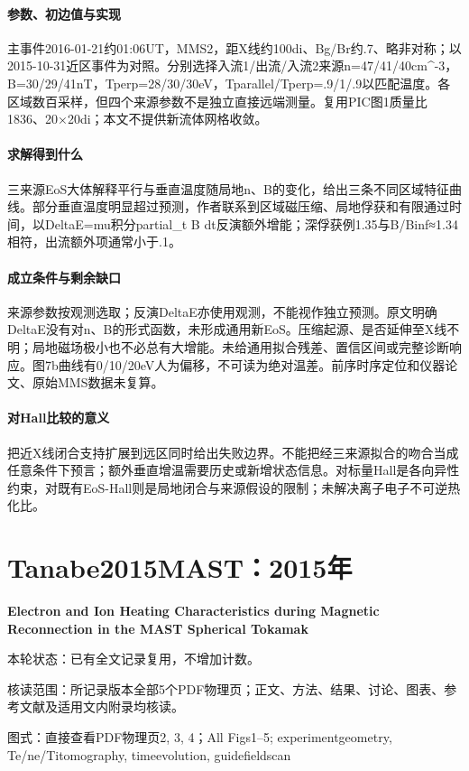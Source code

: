 \paragraph{参数、初边值与实现}主事件2016-01-21约01:06UT，MMS2，距X线约100di、Bg/Br约.7、略非对称；以2015-10-31近区事件为对照。分别选择入流1/出流/入流2来源n=47/41/40cm\textasciicircum{}-3，B=30/29/41nT，Tperp=28/30/30eV，Tparallel/Tperp=.9/1/.9以匹配温度。各区域数百采样，但四个来源参数不是独立直接远端测量。复用PIC图1质量比1836、20×20di；本文不提供新流体网格收敛。

\paragraph{求解得到什么}三来源EoS大体解释平行与垂直温度随局地n、B的变化，给出三条不同区域特征曲线。部分垂直温度明显超过预测，作者联系到区域磁压缩、局地俘获和有限通过时间，以DeltaE=mu积分partial\_t B dt反演额外增能；深俘获例1.35与B/Binf≈1.34相符，出流额外项通常小于.1。

\paragraph{成立条件与剩余缺口}来源参数按观测选取；反演DeltaE亦使用观测，不能视作独立预测。原文明确DeltaE没有对n、B的形式函数，未形成通用新EoS。压缩起源、是否延伸至X线不明；局地磁场极小也不必总有大增能。未给通用拟合残差、置信区间或完整诊断响应。图7b曲线有0/10/20eV人为偏移，不可读为绝对温差。前序时序定位和仪器论文、原始MMS数据未复算。

\paragraph{对Hall比较的意义}把近X线闭合支持扩展到远区同时给出失败边界。不能把经三来源拟合的吻合当成任意条件下预言；额外垂直增温需要历史或新增状态信息。对标量Hall是各向异性约束，对既有EoS-Hall则是局地闭合与来源假设的限制；未解决离子电子不可逆热化比。

\section{Tanabe2015MAST：2015年}\label{paper:Tanabe2015MAST}

\textbf{Electron and Ion Heating Characteristics during Magnetic Reconnection in the MAST Spherical Tokamak}\citep{Tanabe2015MAST}

\textsf{本轮状态：}已有全文记录复用，不增加计数。

\textsf{核读范围：}所记录版本全部5个PDF物理页；正文、方法、结果、讨论、图表、参考文献及适用文内附录均核读。\par\textsf{图式：}直接查看PDF物理页2, 3, 4；All Figs1–5;  experimentgeometry, Te/ne/Titomography, timeevolution, guidefieldscan


